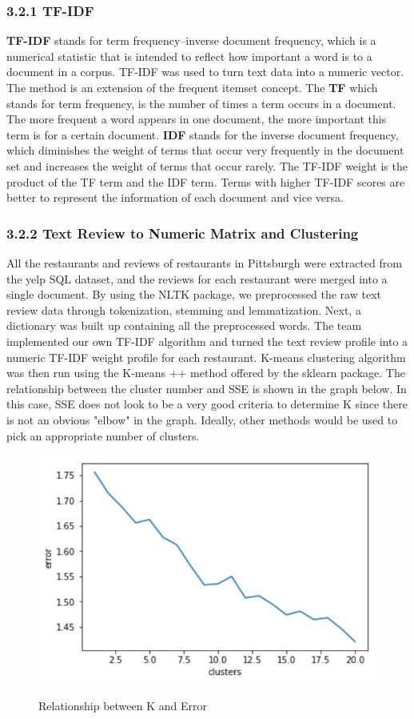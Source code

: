 \documentclass{neu_handout}
\begin{document}
\subsubsection*{3.2.1 TF-IDF}
\textbf{TF-IDF} stands for term frequency–inverse document frequency, which is a numerical statistic that is intended to reflect how important a word is to a document in a corpus. TF-IDF was used to turn text data into a numeric vector. The method is an extension of the frequent itemset concept. The \textbf{TF} which stands for term frequency, is the number of times a term occurs in a document. The more frequent a word appears in one document, the more important this term is for a certain document. \textbf{IDF} stands for the inverse document frequency, which diminishes the weight of terms that occur very frequently in the document set and increases the weight of terms that occur rarely. The TF-IDF weight is the product of the TF term and the IDF term. Terms with higher TF-IDF scores are better to represent the information of each document and vice versa.

\subsubsection*{3.2.2 Text Review to Numeric Matrix and Clustering}
All the restaurants and reviews of restaurants in Pittsburgh were extracted from the yelp SQL dataset, and the reviews for each restaurant were merged into a single document. By using the NLTK package, we preprocessed the raw text review data through tokenization, stemming and lemmatization. Next, a dictionary was built up containing all the preprocessed words. The team implemented our own TF-IDF algorithm and turned the text review profile into a numeric TF-IDF weight profile for each restaurant. K-means clustering algorithm was then run using the K-means ++ method offered by the sklearn package. The relationship between the cluster number and SSE is shown in the graph below. In this case, SSE does not look to be a very good criteria to determine K since there is not an obvious "elbow" in the graph. Ideally, other methods would be used to pick an appropriate number of clusters. 

\begin{figure}[h]
\centering
{
\includegraphics[width=0.4\linewidth]{KvsError}
}
\caption{Relationship between K and Error}
\end{figure}
\end{document}
